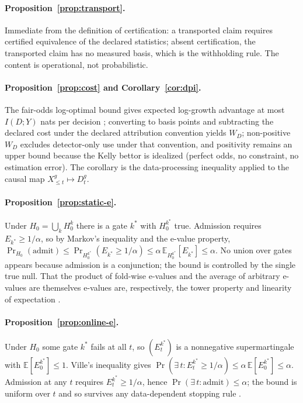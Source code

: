 \documentclass[3p]{elsarticle}
\begin{document}
\paragraph{Proposition~\ref{prop:transport}.} Immediate from the definition
of certification: a transported claim requires certified equivalence of the
declared statistics; absent certification, the transported claim has no
measured basis, which is the withholding rule. The content is operational,
not probabilistic.

\paragraph{Proposition~\ref{prop:cost} and Corollary~\ref{cor:dpi}.} The
fair-odds log-optimal bound gives expected log-growth advantage at most
$I(D;Y)$ nats per decision \citep{Kelly1956,AlgoetCover1988,CoverThomas2006};
converting to basis points and subtracting the declared cost under the
declared attribution convention yields $W_D$; non-positive $W_D$ excludes
detector-only use under that convention, and positivity remains an upper
bound because the Kelly bettor is idealized (perfect odds, no constraint, no
estimation error). The corollary is the data-processing inequality applied to
the causal map $X_{\le t}^g \mapsto D_t^g$.

\paragraph{Proposition~\ref{prop:static-e}.} Under $H_0=\bigcup_k H_0^k$ there
is a gate $k^\ast$ with $H_0^{k^\ast}$ true. Admission requires
$E_{k^\ast}\ge1/\alpha$, so by Markov's inequality and the e-value property,
$\Pr_{H_0}(\text{admit})\le\Pr_{H_0^{k^\ast}}(E_{k^\ast}\ge1/\alpha)
\le\alpha\,\mathbb{E}_{H_0^{k^\ast}}[E_{k^\ast}]\le\alpha$. No union over
gates appears because admission is a conjunction; the bound is controlled by
the single true null. That the product of fold-wise e-values and the average
of arbitrary e-values are themselves e-values are, respectively, the tower
property and linearity of expectation \citep{VovkWang2021}.

\paragraph{Proposition~\ref{prop:online-e}.} Under $H_0$ some gate $k^\ast$
fails at all $t$, so $(E^{k^\ast}_t)$ is a nonnegative supermartingale with
$\mathbb{E}[E^{k^\ast}_0]\le1$. Ville's inequality gives
$\Pr(\exists\,t:E^{k^\ast}_t\ge1/\alpha)\le\alpha\,\mathbb{E}[E^{k^\ast}_0]
\le\alpha$. Admission at any $t$ requires $E^{k^\ast}_t\ge1/\alpha$, hence
$\Pr(\exists\,t:\text{admit})\le\alpha$; the bound is uniform over $t$ and so
survives any data-dependent stopping rule \citep{Ramdas2023}.
\end{document}
